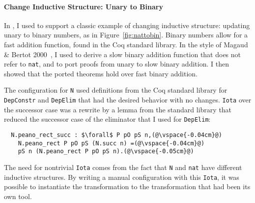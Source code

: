 \paragraph{Change Inductive Structure: Unary to Binary}
In \href{https://github.com/uwplse/pumpkin-pi/blob/v2.0.0/plugin/coq/nonorn.v}{}, I used \toolnamec to support a classic example of changing inductive structure:
updating unary to binary numbers,
as in Figure~\ref{fig:nattobin}.
Binary numbers allow for a fast addition function, found in the Coq standard library.
In the style of Magaud \& Bertot 2000~\cite{magaud2000changing}, I used \toolnamec to derive a slow binary
addition function that does not refer to \lstinline{nat},
and to port proofs from unary to slow binary addition.
I then showed that the ported theorems hold over fast binary addition.

The configuration for \lstinline{N} used definitions from the Coq standard library
for \lstinline{DepConstr} and \lstinline{DepElim} that had the desired behavior with no changes.
\lstinline{Iota} over the successor case was a rewrite by a lemma
from the standard library that reduced the successor case of the eliminator that I used for \lstinline{DepElim}:

\begin{lstlisting}
  N.peano_rect_succ : $\forall$ P pO pS n,(@\vspace{-0.04cm}@)
    N.peano_rect P pO pS (N.succ n) =(@\vspace{-0.04cm}@)
    pS n (N.peano_rect P pO pS n).(@\vspace{-0.05cm}@)
\end{lstlisting}
%
The need for nontrivial \lstinline{Iota} comes from the fact that \lstinline{N} and \lstinline{nat}
have different inductive structures.
By writing a manual configuration with this \lstinline{Iota}, it was possible to instantiate the \toolnamec transformation
to the transformation that had been its own tool.

